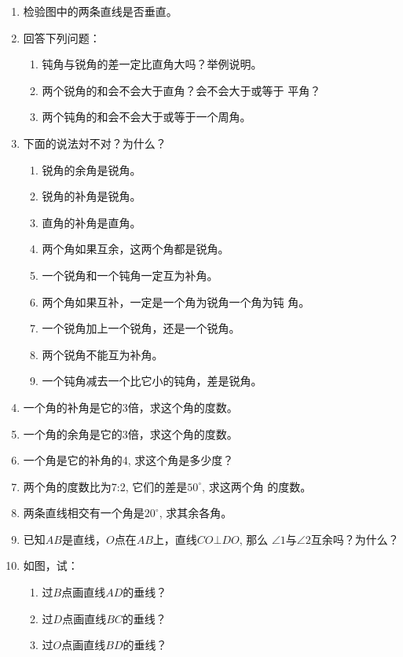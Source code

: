 \begin{enumerate}
\item 检验图中的两条直线是否垂直。
\item 回答下列问题：
\begin{enumerate}
\item 钝角与锐角的差一定比直角大吗？举例说明。
\item 两个锐角的和会不会大于直角？会不会大于或等于
平角？
\item 两个钝角的和会不会大于或等于一个周角。
\end{enumerate}

\item 下面的说法対不对？为什么？
\begin{enumerate}
\item 锐角的余角是锐角。
\item 锐角的补角是锐角。
\item 直角的补角是直角。
\item 两个角如果互余，这两个角都是锐角。
\item 一个锐角和一个钝角一定互为补角。
\item 两个角如果互补，一定是一个角为锐角一个角为钝
角。
\item 一个锐角加上一个锐角，还是一个锐角。
\item 两个锐角不能互为补角。
\item 一个钝角减去一个比它小的钝角，差是锐角。
\end{enumerate}

\item 一个角的补角是它的3倍，求这个角的度数。
\item 一个角的余角是它的3倍，求这个角的度数。
\item 一个角是它的补角的4, 求这个角是多少度？
\item 两个角的度数比为7:2, 它们的差是$50^{\circ}$, 求这两个角
的度数。
\item 两条直线相交有一个角是$20^{\circ}$, 求其余各角。
\item 已知$AB$是直线，$O$点在$AB$上，直线$CO\bot DO$, 那么
$\angle 1$与$\angle 2$互余吗？为什么？
\item 如图，试：
\begin{enumerate}
\item 过$B$点画直线$AD$的垂线？
\item 过$D$点画直线$BC$的垂线？
\item 过$O$点画直线$BD$的垂线？
\end{enumerate}


\end{enumerate}
